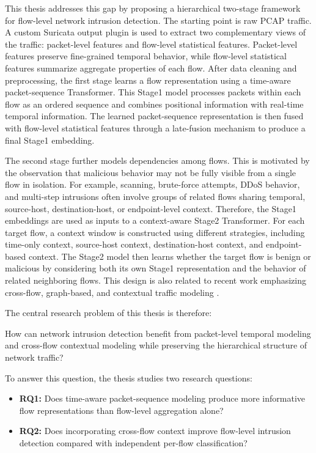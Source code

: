 \documentclass[11pt,fleqn]{report}
\begin{document}
This thesis addresses this gap by proposing a hierarchical two-stage framework for flow-level network intrusion detection. The starting point is raw PCAP traffic. A custom Suricata output plugin is used to extract two complementary views of the traffic: packet-level features and flow-level statistical features. Packet-level features preserve fine-grained temporal behavior, while flow-level statistical features summarize aggregate properties of each flow. After data cleaning and preprocessing, the first stage learns a flow representation using a time-aware packet-sequence Transformer. This Stage1 model processes packets within each flow as an ordered sequence and combines positional information with real-time temporal information. The learned packet-sequence representation is then fused with flow-level statistical features through a late-fusion mechanism to produce a final Stage1 embedding.

The second stage further models dependencies among flows. This is motivated by the observation that malicious behavior may not be fully visible from a single flow in isolation. For example, scanning, brute-force attempts, DDoS behavior, and multi-step intrusions often involve groups of related flows sharing temporal, source-host, destination-host, or endpoint-level context. Therefore, the Stage1 embeddings are used as inputs to a context-aware Stage2 Transformer. For each target flow, a context window is constructed using different strategies, including time-only context, source-host context, destination-host context, and endpoint-based context. The Stage2 model then learns whether the target flow is benign or malicious by considering both its own Stage1 representation and the behavior of related neighboring flows. This design is also related to recent work emphasizing cross-flow, graph-based, and contextual traffic modeling \cite{Deng2023FlowTopology,Zhong2024GNNSurvey,Li2024DoLLM}.

The central research problem of this thesis is therefore:

\begin{displayquote}
How can network intrusion detection benefit from packet-level temporal modeling and cross-flow contextual modeling while preserving the hierarchical structure of network traffic?
\end{displayquote}

To answer this question, the thesis studies two research questions:

\begin{itemize}
    \item \textbf{RQ1:} Does time-aware packet-sequence modeling produce more informative flow representations than flow-level aggregation alone?
    \item \textbf{RQ2:} Does incorporating cross-flow context improve flow-level intrusion detection compared with independent per-flow classification?
\end{itemize}
\end{document}
